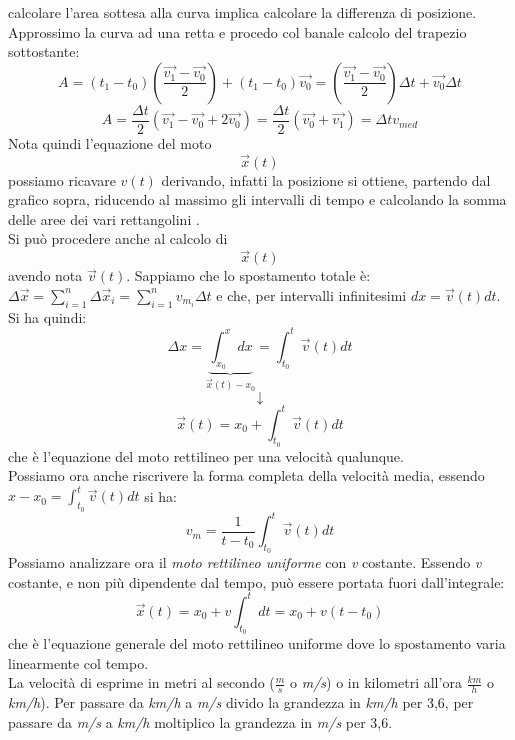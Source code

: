 \documentclass[a4paper,12pt, oneside]{book}
\begin{document}
calcolare l'area sottesa alla curva implica calcolare la differenza di posizione. Approssimo la curva ad una retta e procedo col banale calcolo del trapezio sottostante:
$$A=(t_1-t_0)(\frac{\vec{v_1}-\vec{v_0}}{2})+(t_1-t_0
	)\vec{v_0}=(\frac{\vec{v_1}-\vec{v_0}}{2})\Delta t+\vec{v_0}\Delta t$$
$$A=\frac{\Delta t}{2}(\vec{v_1}-\vec{v_0}+2\vec{v_0})=\frac{\Delta t}{2}(\vec{v_0}+\vec{v_1})=\Delta t v_{med}$$
Nota quindi l'equazione del moto $$\vec{x}(t)$$ possiamo ricavare $v(t)$ derivando, infatti la posizione si ottiene, partendo dal grafico sopra, riducendo al massimo gli intervalli di tempo e calcolando la somma delle aree dei vari rettangolini .\\
Si può procedere anche al calcolo di $$\vec{x}(t)$$ avendo nota $\vec{v}(t)$. Sappiamo che lo spostamento totale è: $\Delta \vec{x}=\sum_{i=1}^n \Delta \vec{x}_i=\sum_{i=1}^n v_{m_i} \Delta t$ e che, per intervalli infinitesimi $dx=\vec{v}(t) dt$. Si ha quindi:
$$\Delta x=\underbrace{\int_{x_0}^x dx}_{\vec{x}(t)-x_0}=\int_{t_0}^t \vec{v}(t) dt$$
$$\downarrow$$
$$\vec{x}(t)=x_0+\int_{t_0}^t \vec{v}(t) dt$$
che è l'equazione del moto rettilineo per una velocità qualunque.\\
Possiamo ora anche riscrivere la forma completa della velocità media, essendo $x-x_0=\int_{t_0}^t \vec{v}(t) dt$ si ha:
$$v_m=\frac{1}{t-t_0}\int_{t_0}^t \vec{v}(t) dt$$
Possiamo analizzare ora il \textit{moto rettilineo uniforme} con \textit{v} costante. Essendo \textit{v} costante, e non più dipendente dal tempo, può essere portata fuori dall'integrale:
$$\vec{x}(t)=x_0+v\int_{t_0}^t dt=x_0+v(t-t_0)$$
che è l'equazione generale del moto rettilineo uniforme dove lo spostamento varia linearmente col tempo.\\
La velocità di esprime in metri al secondo ($\frac{m}{s}$ o \textit{m/s}) o in kilometri all'ora $\frac{km}{h}$ o \textit{km/h}). Per passare da \textit{km/h} a \textit{m/s} divido la grandezza in \textit{km/h} per 3,6, per passare da \textit{m/s} a \textit{km/h} moltiplico la grandezza in \textit{m/s} per 3,6.
\end{document}
